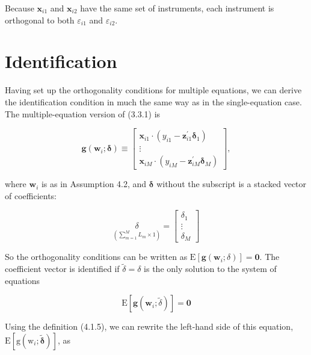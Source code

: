 \documentclass[10pt]{article}
\begin{document}
Because $\mathbf{x}_{i 1}$ and $\mathbf{x}_{i 2}$ have the same set of instruments, each instrument is orthogonal to both $\varepsilon_{i 1}$ and $\varepsilon_{i 2}$.

\section*{Identification}
Having set up the orthogonality conditions for multiple equations, we can derive the identification condition in much the same way as in the single-equation case. The multiple-equation version of (3.3.1) is

\[
\mathbf{g}\left(\mathbf{w}_{i} ; \boldsymbol{\delta}\right) \equiv\left[\begin{array}{c}
\mathbf{x}_{i 1} \cdot\left(y_{i 1}-\mathbf{z}_{i 1}^{\prime} \boldsymbol{\delta}_{1}\right)  \tag{4.1.5}\\
\vdots \\
\mathbf{x}_{i M} \cdot\left(y_{i M}-\mathbf{z}_{i M}^{\prime} \boldsymbol{\delta}_{M}\right)
\end{array}\right],
\]

where $\mathbf{w}_{i}$ is as in Assumption 4.2, and $\boldsymbol{\delta}$ without the subscript is a stacked vector of coefficients:

\[
\underset{\left(\sum_{m=1}^{M} L_{m} \times 1\right)}{\delta}=\left[\begin{array}{c}
\delta_{1}  \tag{4.1.6}\\
\vdots \\
\delta_{M}
\end{array}\right]
\]

So the orthogonality conditions can be written as $\mathrm{E}\left[\mathbf{g}\left(\mathbf{w}_{i} ; \delta\right)\right]=\mathbf{0}$. The coefficient vector is identified if $\tilde{\delta}=\delta$ is the only solution to the system of equations


\begin{equation*}
\mathrm{E}\left[\mathbf{g}\left(\mathbf{w}_{i} ; \tilde{\delta}\right)\right]=\mathbf{0} \tag{4.1.7}
\end{equation*}


Using the definition (4.1.5), we can rewrite the left-hand side of this equation, $\mathrm{E}\left[\mathrm{g}\left(\mathrm{w}_{i} ; \tilde{\boldsymbol{\delta}}\right)\right]$, as
\end{document}
